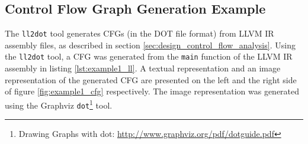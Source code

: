 
\subsection{Control Flow Graph Generation Example}
\label{app:control_flow_graph_generation_example}

The \texttt{ll2dot} tool generates CFGs (in the DOT file format) from LLVM IR assembly files, as described in section \ref{sec:design_control_flow_analysis}. Using the \texttt{ll2dot} tool, a CFG was generated from the \texttt{main} function of the LLVM IR assembly in listing \ref{lst:example1_ll}. A textual representation and an image representation of the generated CFG are presented on the left and the right side of figure \ref{fig:example1_cfg} respectively. The image representation was generated using the Graphviz \texttt{dot}\footnote{Drawing Graphs with dot: \url{http://www.graphviz.org/pdf/dotguide.pdf}} tool.

